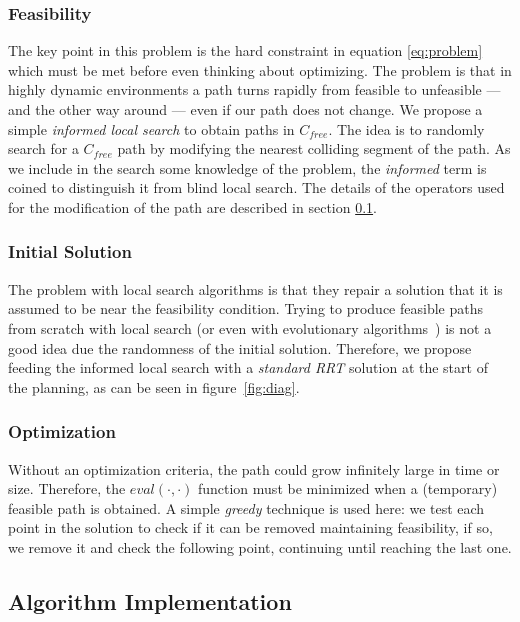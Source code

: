 \documentclass[10pt, conference, compsoc]{IEEEtran}
\begin{document}
\subsubsection{Feasibility}
The key point in this problem is the hard constraint in equation \ref{eq:problem}
which must be met before even thinking about optimizing. The problem is that in
highly dynamic environments a path turns rapidly from feasible to unfeasible
--- and the other way around --- even if our path does not change. 
We propose a simple \emph{informed local search} to obtain paths in $C_{free}$.
The idea is to randomly search for a $C_{free}$ path by modifying the nearest colliding
segment of the path. As we include in the search some knowledge of the problem,
the \emph{informed} term is coined to distinguish it from blind local search.
The details of the operators used for the modification of the path are described in
section \ref{sec:implementation}.
\subsubsection{Initial Solution}
The problem with local search algorithms is that they repair a solution that it is
assumed to be near the feasibility condition. 
Trying to produce feasible paths from scratch with local search (or even
with evolutionary algorithms~\cite{Xiao97}) is not a good idea due the randomness of the
initial solution. Therefore, we propose feeding the informed local search with a \emph{standard RRT} solution
at the start of the planning, as can be seen in figure~\ref{fig:diag}. 
\subsubsection{Optimization}
Without an optimization criteria, the path could grow infinitely large in time or
size. Therefore, the $eval(\cdot,\cdot)$ function must be minimized when a
(temporary) feasible path is obtained. A simple \emph{greedy} technique is used
here: we test each point in the solution to check if it can be removed
maintaining feasibility, if so, we remove it and check the following point,
continuing until reaching the last one.

\subsection{Algorithm Implementation}
\label{sec:implementation}

\end{document}
